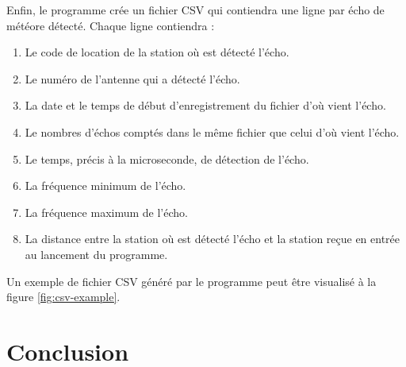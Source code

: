 \documentclass[11pt]{article}
\begin{document}
Enfin, le programme crée un fichier CSV qui contiendra une ligne par écho de météore détecté.
Chaque ligne contiendra :
\begin{enumerate}
    \item Le code de location de la station où est détecté l'écho.
    \item Le numéro de l'antenne qui a détecté l'écho.
    \item La date et le temps de début d'enregistrement du fichier d'où vient l'écho.
    \item Le nombres d'échos comptés dans le même fichier que celui d'où vient l'écho.
    \item Le temps, précis à la microseconde, de détection de l'écho.
    \item La fréquence minimum de l'écho.
    \item La fréquence maximum de l'écho.
    \item La distance entre la station où est détecté l'écho et la station reçue en entrée au lancement du programme.
\end{enumerate}

Un exemple de fichier CSV généré par le programme peut être visualisé à la figure \ref{fig:csv-example}.

\newpage

\section{Conclusion}
\end{document}
